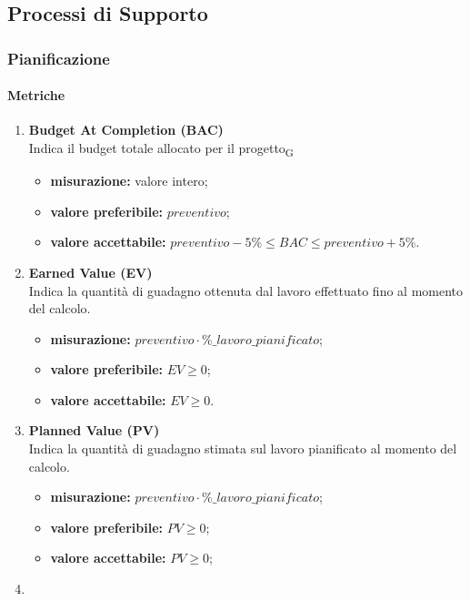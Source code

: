 \subsection{Processi di Supporto}
\subsubsection{Pianificazione}
\paragraph{Metriche}
\begin{enumerate}
	\item[]
	      \textbf{Budget At Completion (BAC)}\\
	      Indica il budget totale allocato per il \gls{progetto}\textsubscript{G}
	      \begin{itemize}
		      \item \textbf{misurazione:} valore intero;
		      \item \textbf{valore preferibile:} $preventivo$;
		      \item \textbf{valore accettabile:} $preventivo-5\%\leq BAC\leq preventivo+5\%$.
	      \end{itemize}
	\item[]
	      \textbf{Earned Value (EV)}\\
	      Indica la quantità di guadagno ottenuta dal lavoro effettuato fino al momento del calcolo.
	      \begin{itemize}
		      \item \textbf{misurazione:} $preventivo\cdot \%\_lavoro\_pianificato$;
		      \item \textbf{valore preferibile:} $EV\geq 0$;
		      \item \textbf{valore accettabile:} $EV\geq 0$.
	      \end{itemize}
	\item[]
	      \textbf{Planned Value (PV)}\\
	      Indica la quantità di guadagno stimata sul lavoro pianificato al momento del calcolo.
	      \begin{itemize}
		      \item \textbf{misurazione:} $preventivo \cdot \%\_lavoro\_pianificato$;
		      \item \textbf{valore preferibile:} $PV\geq 0$;
		      \item \textbf{valore accettabile:} $PV\geq 0$;
	      \end{itemize}
	\item[]

\end{enumerate}
